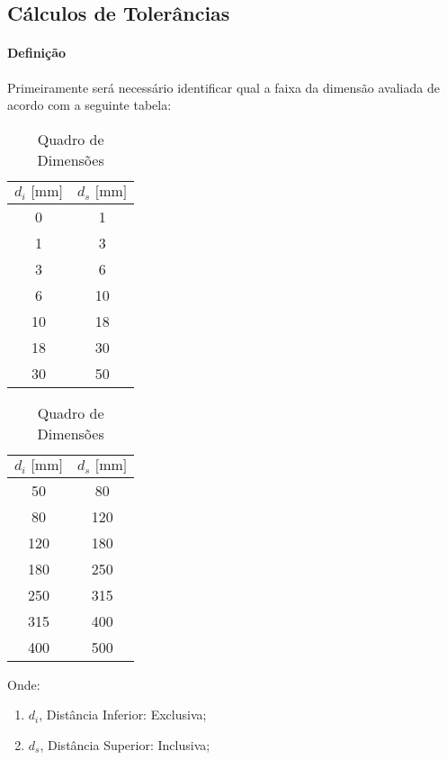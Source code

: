 \documentclass{article}
\begin{document}
        \subsection{Cálculos de Tolerâncias}
            \paragraph{Definição}Primeiramente será necessário identificar qual a faixa da dimensão avaliada de acordo com a seguinte tabela:
                \begin{table}[H]
                    \centering
                    \begin{tabular}[]{c | c}\hline
                        $d_{i} \text{ [mm]}$ & $d_{s} \text{ [mm]}$\\[1mm]\hline
                        0         & 1\\
                        1         & 3\\
                        3         & 6\\
                        6         & 10\\
                        10        & 18\\
                        18        & 30\\
                        30        & 50\\\hline
                    \end{tabular}
                    \hspace{20mm}
                    \begin{tabular}[]{c | c}\hline
                        $d_{i} \text{ [mm]}$ & $d_{s} \text{ [mm]}$\\[1mm]\hline
                        50        & 80\\
                        80        & 120\\
                        120       & 180\\
                        180       & 250\\
                        250       & 315\\
                        315       & 400\\
                        400       & 500\\\hline
                    \end{tabular}
                    \caption{Quadro de Dimensões}\label{table:dimesion}
                \end{table} \noindent
            Onde:
                \begin{enumerate}[noitemsep]
                    \item $d_{i}$, Distância Inferior: Exclusiva;
                    \item $d_{s}$, Distância Superior: Inclusiva;
                \end{enumerate}
\end{document}
